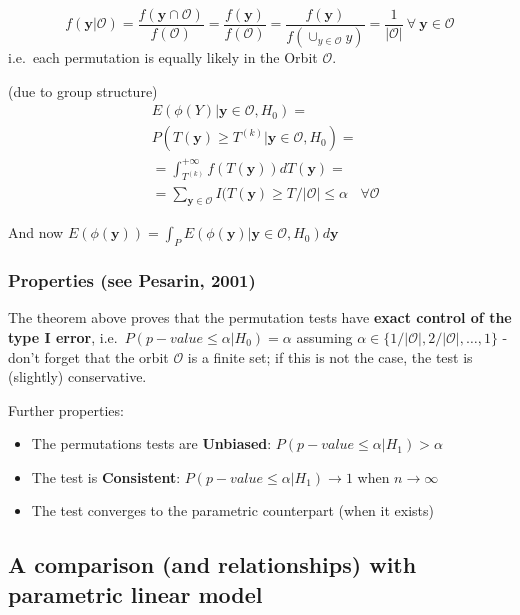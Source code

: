 \documentclass[
]{article}
\providecommand{\tightlist}{%
  \setlength{\itemsep}{0pt}\setlength{\parskip}{0pt}}
\begin{document}
\[f(\mathbf{y}|\mathcal{O})=\frac{f(\mathbf{y}\cap\mathcal{O})}{f(\mathcal{O})}=
\frac{f(\mathbf{y})}{f(\mathcal{O})}=
\frac{f(\mathbf{y})}{f(\cup_{y\in\mathcal{O}}y)}=\frac{1}{|\mathcal{O}|}\ \forall\ \mathbf{y}\in \mathcal{O}\]
i.e.~each permutation is equally likely in the Orbit \(\mathcal{O}\).

(due to group structure) \[
\begin{aligned}
&E(\phi(Y)|\mathbf{y}\in\mathcal{O}, H_0)=\\
&P(T(\mathbf{y})\geq T^{(k)} | \mathbf{y}\in\mathcal{O}, H_0)=\\
&=\int_{T^{(k)}}^{+\infty} f(T(\mathbf{y}))dT(\mathbf{y})=\\
&=\sum_{\mathbf{y}\in\mathcal{O}} I(T(\mathbf{y})\geq T^{}/|\mathcal{O}|\leq \alpha
\ \ \ \ \forall\mathcal{O}
\end{aligned}
\]

And now
\(E(\phi(\mathbf{y}))=\int_P E(\phi(\mathbf{y})|\mathbf{y}\in\mathcal{O}, H_0) d\mathbf{y}\)

\hypertarget{properties-see-pesarin-2001}{%
\subsubsection{Properties (see Pesarin,
2001)}\label{properties-see-pesarin-2001}}

The theorem above proves that the permutation tests have \textbf{exact
control of the type I error}, i.e.~\(P(p-value\leq \alpha|H_0)=\alpha\)
assuming \(\alpha\in \{1/|\mathcal{O}|,2/|\mathcal{O}|,\ldots,1\}\) -
don't forget that the orbit \(\mathcal{O}\) is a finite set; if this is
not the case, the test is (slightly) conservative.

Further properties:

\begin{itemize}
\tightlist
\item
  The permutations tests are \textbf{Unbiased}:
  \(P(p-value\leq \alpha|H_1)>\alpha\)\\
\item
  The test is \textbf{Consistent}: \(P(p-value\leq \alpha|H_1)\to 1\)
  when \(n\to\infty\)\\
\item
  The test converges to the parametric counterpart (when it exists)
\end{itemize}

\hypertarget{a-comparison-and-relationships-with-parametric-linear-model}{%
\subsection{A comparison (and relationships) with parametric linear
model}\label{a-comparison-and-relationships-with-parametric-linear-model}}
\end{document}
